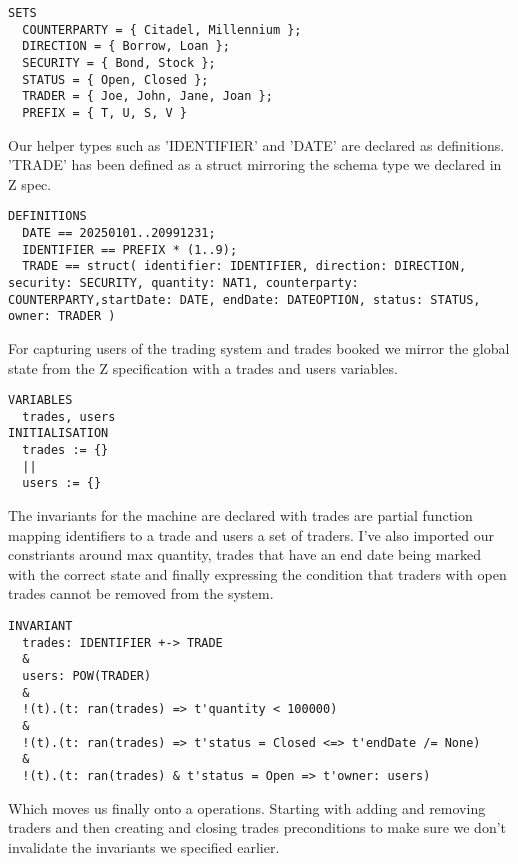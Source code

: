 \documentclass{article}
\begin{document}
\begin{lstlisting}
SETS 
  COUNTERPARTY = { Citadel, Millennium };
  DIRECTION = { Borrow, Loan };
  SECURITY = { Bond, Stock };
  STATUS = { Open, Closed };
  TRADER = { Joe, John, Jane, Joan };
  PREFIX = { T, U, S, V }
\end{lstlisting}

\hspace{-0.7cm} Our helper types such as 'IDENTIFIER' and 'DATE' are declared as definitions. 'TRADE' has been defined as a struct mirroring the schema type we declared in Z spec.

\begin{lstlisting}
DEFINITIONS
  DATE == 20250101..20991231;
  IDENTIFIER == PREFIX * (1..9);
  TRADE == struct( identifier: IDENTIFIER, direction: DIRECTION, security: SECURITY, quantity: NAT1, counterparty: COUNTERPARTY,startDate: DATE, endDate: DATEOPTION, status: STATUS, owner: TRADER )
\end{lstlisting}

\hspace{-0.7cm} For capturing users of the trading system and trades booked we mirror the global state from the Z specification with a trades and users variables.

\begin{lstlisting}
VARIABLES
  trades, users
INITIALISATION
  trades := {}
  ||
  users := {}
\end{lstlisting}
    
\hspace{-0.7cm} The invariants for the machine are declared with trades are partial function mapping identifiers to a trade and users a set of traders. I've also imported our constriants around max quantity, trades that have an end date being marked with the correct state and finally expressing the condition that traders with open trades cannot be removed from the system.

\begin{lstlisting}
INVARIANT
  trades: IDENTIFIER +-> TRADE
  &
  users: POW(TRADER)    
  &
  !(t).(t: ran(trades) => t'quantity < 100000)
  &
  !(t).(t: ran(trades) => t'status = Closed <=> t'endDate /= None)
  &
  !(t).(t: ran(trades) & t'status = Open => t'owner: users)
\end{lstlisting}

\hspace{-0.7cm} Which moves us finally onto a operations. Starting with adding and removing traders and then creating and closing trades preconditions to make sure we don't invalidate the invariants we specified earlier. 
\end{document}
